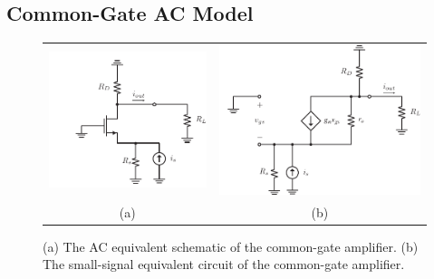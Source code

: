 \subsection{Common-Gate AC Model}
\begin{figure}[tb]
\begin{center}
\begin{tabular}{cc}
\includegraphics[scale=.9]{cgamp_is_ac} &
\includegraphics[scale=.9]{cgamp_is_ac_ss} \\
(a) & (b) \\
\end{tabular}
\end{center}
\caption{(a) The AC equivalent schematic of the common-gate amplifier.  (b) The small-signal equivalent circuit of the common-gate amplifier.}
\label{fig:cgamp_is_ac}
\end{figure}

